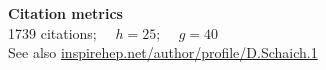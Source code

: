 \renewenvironment{spacelist} {
  \begin{list} {} {
    \setlength{\topsep}{-8 pt}
    \setlength{\itemsep}{5 pt}
    \setlength{\leftmargin}{-1.15 in}
  }
}{
  \end{list}
}

\raggedright

\begin{spacelist}
  \item {\large \bfseries Citation metrics} \\[6 pt]
  1739 citations; \ \ \href{https://en.wikipedia.org/wiki/H-index}{$h = 25$}; \ \ \href{https://en.wikipedia.org/wiki/G-index}{$g = 40$} \\[2 pt]
  See also \href{http://inspirehep.net/author/profile/D.Schaich.1}{inspirehep.net/author/profile/D.Schaich.1} \\[15 pt]


\end{spacelist}
